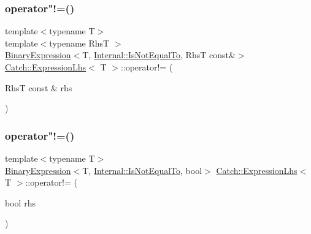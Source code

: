 \subsubsection{\texorpdfstring{operator"!=()}{operator!=()}\hspace{0.1cm}{\footnotesize\ttfamily [1/2]}}
{\footnotesize\ttfamily template$<$typename T$>$ \\
template$<$typename RhsT $>$ \\
\hyperlink{class_catch_1_1_binary_expression}{Binary\+Expression}$<$T, \hyperlink{namespace_catch_1_1_internal_ae3f96598a7858155750bf38e7295d83ea1e1699cf7d3dbee0908f1a123da2456d}{Internal\+::\+Is\+Not\+Equal\+To}, RhsT const\&$>$ \hyperlink{class_catch_1_1_expression_lhs}{Catch\+::\+Expression\+Lhs}$<$ T $>$\+::operator!= (\begin{DoxyParamCaption}\item[{RhsT const \&}]{rhs }\end{DoxyParamCaption})\hspace{0.3cm}{\ttfamily [inline]}}

\mbox{\label{class_catch_1_1_expression_lhs_a1f3ff934880623f12a4cbd9725397ccf}} 
\subsubsection{\texorpdfstring{operator"!=()}{operator!=()}\hspace{0.1cm}{\footnotesize\ttfamily [2/2]}}
{\footnotesize\ttfamily template$<$typename T$>$ \\
\hyperlink{class_catch_1_1_binary_expression}{Binary\+Expression}$<$T, \hyperlink{namespace_catch_1_1_internal_ae3f96598a7858155750bf38e7295d83ea1e1699cf7d3dbee0908f1a123da2456d}{Internal\+::\+Is\+Not\+Equal\+To}, bool$>$ \hyperlink{class_catch_1_1_expression_lhs}{Catch\+::\+Expression\+Lhs}$<$ T $>$\+::operator!= (\begin{DoxyParamCaption}\item[{bool}]{rhs }\end{DoxyParamCaption})\hspace{0.3cm}{\ttfamily [inline]}}

\mbox{\label{class_catch_1_1_expression_lhs_a919c48e52ff1be5f7329920d4da8e92f}} 
